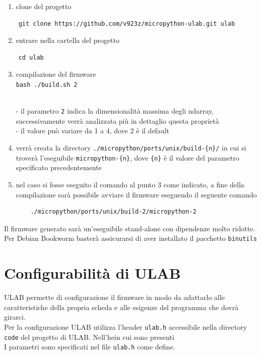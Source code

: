 \documentclass[12pt,a4paper]{report}
\begin{document}
\begin{enumerate}
\item
  clone del progetto
\end{enumerate}

\begin{verbatim}
    git clone https://github.com/v923z/micropython-ulab.git ulab
\end{verbatim}

\begin{enumerate}
\setcounter{enumi}{1}
\item
  entrare nella cartella del progetto
\end{enumerate}
\begin{verbatim}
    cd ulab
\end{verbatim}

\begin{enumerate}
\setcounter{enumi}{2}
\item
  compilazione del firmware\\
  \texttt{bash\ ./build.sh\ 2\ }\strut \\
  - il parametro \texttt{2} indica la dimensionalità massima degli
  ndarray, successivamente verrà analizzata più in dettaglio questa
  proprietà\\
  - il valore può variare da 1 a 4, dove 2 è il default
\item
  verrà creata la directory
  \texttt{./micropython/ports/unix/build-\{n\}/} in cui si troverà
  l'eseguibile \texttt{micropython-\{n\}}, dove
  \texttt{\{n\}} è il valore del parametro specificato precedentemente
\item
  nel caso si fosse eseguito il comando al punto 3 come indicato, a fine
  della compilazione sarà possibile avviare il firmware eseguendo il
  seguente comando
\begin{verbatim}
    ./micropython/ports/unix/build-2/micropython-2
\end{verbatim}
\end{enumerate}

Il firmware generato sarà un'eseguibile stand-alone con
dipendenze molto ridotte. Per Debian Bookworm basterà assicurarsi di
aver installato il pacchetto \texttt{binutils}

\section{Configurabilità di ULAB}

ULAB permette di configurazione il firmware in modo da adattarlo alle
caratteristiche della propria scheda e alle esigenze del programma che
dovrà girarci.\\
Per la configurazione ULAB utilizza l'header
\texttt{ulab.h} accessibile nella directory \texttt{code} del progetto
di ULAB. Nell'hein cui sono presenti\\
I parametri sono specificati nel file \texttt{ulab.h} come define.
\end{document}
